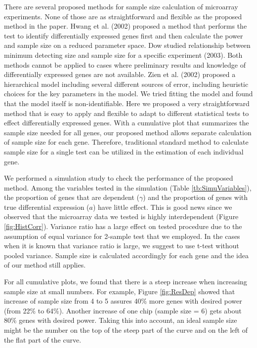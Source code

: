 \documentclass{bioinfo}
\begin{document}
There are several proposed methods for sample size calculation of
microarray experiments. None of those are as straightforward and
flexible as the proposed method in the paper. Hwang et al. (2002)
proposed a method that performs the test to identify
differentially expressed genes first and then calculate the power
and sample size on a reduced parameter space. Dow studied
relationship between minimum detecting size and sample size for a
specific experiment (2003). Both methods cannot be applied to
cases where preliminary results and knowledge of differentially
expressed genes are not available. Zien et al. (2002) proposed a
hierarchical model including several different sources of error,
including heuristic choices for the key parameters in the model.
We tried fitting the model and found that the model itself is
non-identifiable. Here we proposed a very straightforward method
that is easy to apply and flexible to adapt to different
statistical tests to effect differentially expressed genes. With a
cumulative plot that summarizes the sample size needed for all
genes, our proposed method allows separate calculation of sample
size for each gene. Therefore, traditional standard method to
calculate sample size for a single test can be utilized in the
estimation of each individual gene.

We performed a simulation study to check the performance of the
proposed method. Among the variables tested in the simulation
(Table \ref{tb:SimuVariables}), the proportion of genes that are
dependent ($\gamma$) and the proportion of genes with true
differential expression ($a$) have little effect. This is good
news since we observed that the microarray data we tested is
highly interdependent (Figure \ref{fig:HistCorr}). Variance ratio
has a large effect on tested procedure due to the assumption of
equal variance for 2-sample test that we employed. In the cases
when it is known that variance ratio is large, we suggest to use
t-test without pooled variance. Sample size is calculated
accordingly for each gene and the idea of our method still
applies.

For all cumulative plots, we found that there is a steep increase
when increasing sample size at small numbers. For example, Figure
\ref{fig:ResDep} showed that increase of sample size from 4 to 5
assures 40\% more genes with desired power (from 22\% to 64\%).
Another increase of one chip (sample size = 6) gets about 80\%
genes with desired power. Taking this into account, an ideal
sample size might be the number on the top of the steep part of
the curve and on the left of the flat part of the curve.
\end{document}
